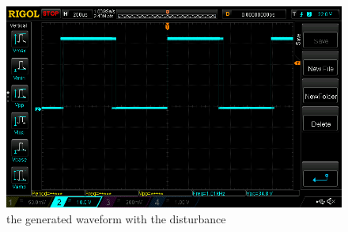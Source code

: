 \documentclass[12pt]{article}
\begin{document}
\begin{figure}[h!]
	\center
	\includegraphics[scale = 0.45]{NewFile1.png}
	\caption{the generated waveform with the disturbance}
\end{figure}
\end{document}
